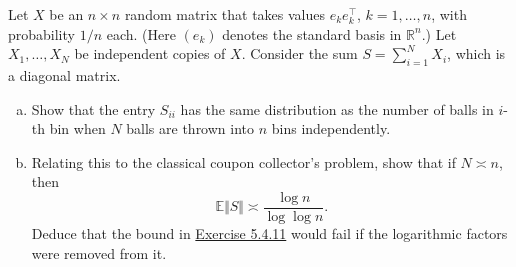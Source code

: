\begin{problem*}[Exercise 5.4.14]\label{ex5.4.14}
	Let \(X\) be an \(n\times n\) random matrix that takes values \(e_ke_k^{\top}\), \(k=1,\dots,n\), with probability \(1/n\) each. (Here \((e_k)\) denotes the standard basis in \(\mathbb{R}^n\).) Let \(X_1,\dots,X_N\) be independent copies of \(X\). Consider the sum \(S=\sum_{i=1}^N X_i\), which is a diagonal matrix.
	\begin{enumerate}[(a)]
		\item\label{ex5.4.14:a} Show that the entry \(S_{ii}\) has the same distribution as the number of balls in \(i\)-th bin when \(N\) balls are thrown into \(n\) bins independently.
		\item\label{ex5.4.14:b} Relating this to the classical coupon collector's problem, show that if \(N \asymp n\), then
		      \[
			      \mathbb{E}\Vert S \Vert\asymp \frac{\log n}{\log\log n}.
		      \]
		      Deduce that the bound in \hyperref[ex5.4.11]{Exercise 5.4.11} would fail if the logarithmic factors were removed from it.
	\end{enumerate}
\end{problem*}
